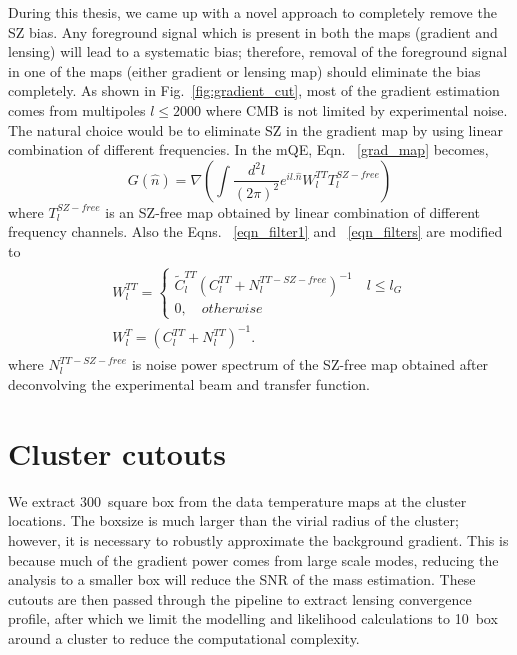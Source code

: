  
 During this thesis, we came up with a novel approach to completely remove the SZ bias. 
 Any foreground signal which is present in both the maps (gradient and lensing) will lead to a systematic bias; therefore, removal of the foreground signal in one of the maps (either gradient or lensing map) should eliminate the bias completely.
  As shown in Fig.~\ref{fig:gradient_cut}, most of the gradient estimation comes from multipoles $l \le 2000$ where CMB is not limited by experimental noise.
  The natural choice would be to eliminate SZ in the gradient map by using linear combination of different frequencies. 
  In the mQE, Eqn. ~\ref{grad_map} becomes,
  \begin{equation}
   G(\hat{n}) = \nabla (\int\frac{d^{2}l}{(2\pi)^{2}} e^{il .\hat{n}} W^{TT}_{l} T^{SZ -free}_{l}   )
  \end{equation}
  where $T^{SZ-free}_{l} $ is an SZ-free map obtained by linear combination of different frequency channels. Also the Eqns. ~\ref{eqn_filter1} and ~\ref{eqn_filters} are modified to 
  \begin{eqnarray}
    \begin{aligned}
   W^{TT}_{l} =  
    \begin{cases}
        \widetilde{C}^{TT}_{l}(C^{TT}_{l} + N^{TT-SZ-free}_{l})^{-1} \quad l \le l_{G}\\
        0, \quad otherwise
    \label{mdf_eqns}
    \end{cases}\\
 W^{T}_{l} = (C^{TT}_{l} + N^{TT}_{l})^{-1}.
 \label{eqs_filters}
 \end{aligned}
  \end{eqnarray} 
  where $N^{TT-SZ-free}_{l}$ is noise power spectrum of the SZ-free map obtained after deconvolving the experimental beam and transfer function. 
  
  \section{Cluster cutouts} %
 

 
\label{sec:cluster_cutouts}
 We extract 300\arcmin\ square box from the data temperature maps at the cluster locations. 
The boxsize is much larger than the virial radius of the cluster; however, it is necessary to robustly approximate the background gradient. 
This is because much of the gradient power comes from large scale modes, reducing the analysis to a smaller box will reduce the SNR of the mass estimation. 
These cutouts are then passed through the pipeline to extract lensing convergence profile, after which we limit the modelling and likelihood calculations to 10\arcmin\ box around a cluster to reduce the computational complexity.

